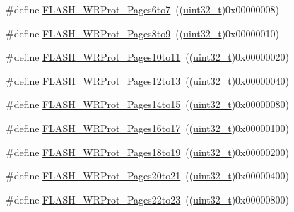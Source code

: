 \begin{DoxyCompactItemize}
\#define \hyperlink{group___option___bytes___write___protection_ga289b919ff7f6e7287facf108b8b94619}{F\+L\+A\+S\+H\+\_\+\+W\+R\+Prot\+\_\+\+Pages6to7}~((\hyperlink{_p_e___types_8h_a33594304e786b158f3fb30289278f5af}{uint32\+\_\+t})0x00000008)
\item 
\#define \hyperlink{group___option___bytes___write___protection_ga72f231c0fe953f3cd43cf421c2626f90}{F\+L\+A\+S\+H\+\_\+\+W\+R\+Prot\+\_\+\+Pages8to9}~((\hyperlink{_p_e___types_8h_a33594304e786b158f3fb30289278f5af}{uint32\+\_\+t})0x00000010)
\item 
\#define \hyperlink{group___option___bytes___write___protection_ga778d8038df46c0d25d9a24717a5c5dc9}{F\+L\+A\+S\+H\+\_\+\+W\+R\+Prot\+\_\+\+Pages10to11}~((\hyperlink{_p_e___types_8h_a33594304e786b158f3fb30289278f5af}{uint32\+\_\+t})0x00000020)
\item 
\#define \hyperlink{group___option___bytes___write___protection_ga571e248a64ef9bf7f99ed85831aacaaa}{F\+L\+A\+S\+H\+\_\+\+W\+R\+Prot\+\_\+\+Pages12to13}~((\hyperlink{_p_e___types_8h_a33594304e786b158f3fb30289278f5af}{uint32\+\_\+t})0x00000040)
\item 
\#define \hyperlink{group___option___bytes___write___protection_ga5e5fcead35c861e1329c3e4e7e3ffa4e}{F\+L\+A\+S\+H\+\_\+\+W\+R\+Prot\+\_\+\+Pages14to15}~((\hyperlink{_p_e___types_8h_a33594304e786b158f3fb30289278f5af}{uint32\+\_\+t})0x00000080)
\item 
\#define \hyperlink{group___option___bytes___write___protection_ga33deabc2c4a82cfa4a98008082e29ea7}{F\+L\+A\+S\+H\+\_\+\+W\+R\+Prot\+\_\+\+Pages16to17}~((\hyperlink{_p_e___types_8h_a33594304e786b158f3fb30289278f5af}{uint32\+\_\+t})0x00000100)
\item 
\#define \hyperlink{group___option___bytes___write___protection_ga856fdcf3d41edc73902fcf93a1e375d9}{F\+L\+A\+S\+H\+\_\+\+W\+R\+Prot\+\_\+\+Pages18to19}~((\hyperlink{_p_e___types_8h_a33594304e786b158f3fb30289278f5af}{uint32\+\_\+t})0x00000200)
\item 
\#define \hyperlink{group___option___bytes___write___protection_ga09215d5d245c8f5cd664c5cc4ff9fb69}{F\+L\+A\+S\+H\+\_\+\+W\+R\+Prot\+\_\+\+Pages20to21}~((\hyperlink{_p_e___types_8h_a33594304e786b158f3fb30289278f5af}{uint32\+\_\+t})0x00000400)
\item 
\#define \hyperlink{group___option___bytes___write___protection_ga58394c78e6b08542381ade1674efe62c}{F\+L\+A\+S\+H\+\_\+\+W\+R\+Prot\+\_\+\+Pages22to23}~((\hyperlink{_p_e___types_8h_a33594304e786b158f3fb30289278f5af}{uint32\+\_\+t})0x00000800)
\item 

\end{DoxyCompactItemize}
